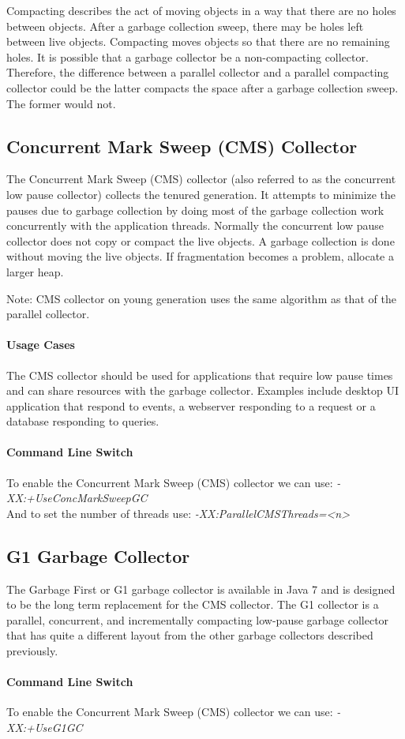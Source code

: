 Compacting describes the act of moving objects in a way that there are no holes between objects. After a garbage collection sweep, there may be holes left between live objects. Compacting moves objects so that there are no remaining holes. It is possible that a garbage collector be a non-compacting collector. Therefore, the difference between a parallel collector and a parallel compacting collector could be the latter compacts the space after a garbage collection sweep. The former would not.\cite{oracleGC}
\subsection{Concurrent Mark Sweep (CMS) Collector}
The Concurrent Mark Sweep (CMS) collector (also referred to as the concurrent low pause collector) collects the tenured generation. It attempts to minimize the pauses due to garbage collection by doing most of the garbage collection work concurrently with the application threads. Normally the concurrent low pause collector does not copy or compact the live objects. A garbage collection is done without moving the live objects. If fragmentation becomes a problem, allocate a larger heap.

Note: CMS collector on young generation uses the same algorithm as that of the parallel collector.\cite{oracleGC}
\paragraph{Usage Cases}
The CMS collector should be used for applications that require low pause times and can share resources with the garbage collector. Examples include desktop UI application that respond to events, a webserver responding to a request or a database responding to queries.\cite{oracleGC}
\paragraph{Command Line Switch}
To enable the Concurrent Mark Sweep (CMS) collector we can use:
\textit{-XX:+UseConcMarkSweepGC}\\
And to set the number of threads use: \textit{-XX:ParallelCMSThreads=<n>}
\subsection{G1 Garbage Collector}
The Garbage First or G1 garbage collector is available in Java 7 and is designed to be the long term replacement for the CMS collector. The G1 collector is a parallel, concurrent, and incrementally compacting low-pause garbage collector that has quite a different layout from the other garbage collectors described previously.\cite{oracleGC}
\paragraph{Command Line Switch}
To enable the Concurrent Mark Sweep (CMS) collector we can use:
\textit{-XX:+UseG1GC}